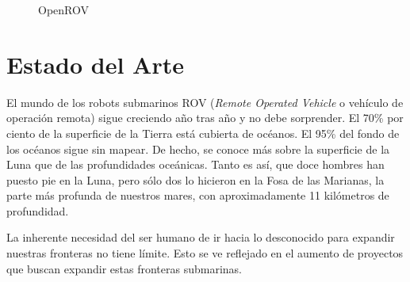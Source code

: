 \begin{figure}[hbtp]
  \begin{center}
  \end{center}
  \caption{OpenROV}
  \label{fig:ROV-ej}
\end{figure}

\section{Estado del Arte}
\label{cap:Estado del Arte}
El mundo de los robots submarinos ROV (\textit{Remote Operated Vehicle} o vehículo de operación  remota) sigue creciendo año tras año y no debe sorprender. El 70\% por ciento de la superficie de la Tierra está cubierta de océanos. El 95\% del fondo de los océanos sigue sin mapear. De hecho, se conoce más sobre la superficie de la Luna que de las profundidades oceánicas. Tanto es así, que doce hombres han puesto pie en la Luna, pero sólo dos lo hicieron en la Fosa de las Marianas, la parte más profunda de nuestros mares, con aproximadamente 11 kilómetros de profundidad.

La inherente necesidad del ser humano de ir hacia lo desconocido para expandir nuestras fronteras no tiene límite. Esto se ve reflejado en el aumento de proyectos que buscan expandir estas fronteras submarinas.

